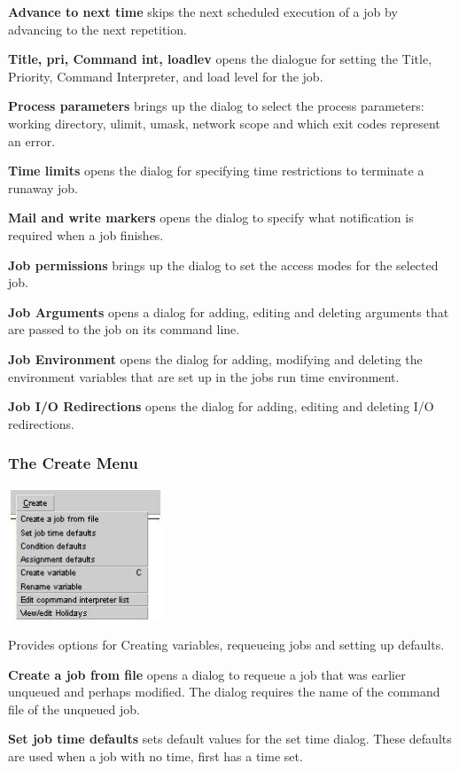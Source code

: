 \textbf{Advance to next time} skips the next scheduled execution of a job by advancing to the next repetition.

\textbf{Title, pri, Command int, loadlev} opens the dialogue for setting the Title, Priority, Command Interpreter, and load level for the job.

\textbf{Process parameters} brings up the dialog to select the process parameters: working directory, ulimit, umask, network scope and which
exit codes represent an error.

\textbf{Time limits} opens the dialog for specifying time restrictions to terminate a runaway job.

\textbf{Mail and write markers} opens the dialog to specify what notification is required when a job finishes.

\textbf{Job permissions} brings up the dialog to set the access modes for the selected job.

\textbf{Job Arguments} opens a dialog for adding, editing and deleting arguments that are passed to the job on its command line.

\textbf{Job Environment} opens the dialog for adding, modifying and deleting the environment variables that are set up in the jobs run time
environment.

\textbf{Job I/O Redirections} opens the dialog for adding, editing and deleting I/O redirections.

\subsubsection{The Create Menu}
 \includegraphics[width=4.657cm,height=3.941cm]{img/ref18.jpg} 

Provides options for Creating variables, requeueing jobs and setting up defaults.

\textbf{Create a job from file} opens a dialog to requeue a job that was earlier unqueued and perhaps modified. The dialog requires the name of
the command file of the unqueued job.

\textbf{Set job time defaults} sets default values for the set time dialog. These defaults are used when a job with no time, first has a
time set.

